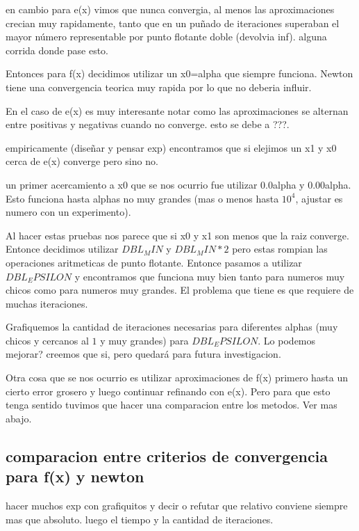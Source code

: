 en cambio para e(x) vimos que nunca convergia, al menos las aproximaciones
crecian muy rapidamente, tanto que en un puñado de iteraciones superaban el
mayor número representable por punto flotante doble (devolvia inf). %
alguna corrida donde pase esto.

Entonces para f(x) decidimos utilizar un x0=alpha que siempre funciona. Newton
tiene una convergencia teorica muy rapida por lo que no deberia influir.

En el caso de e(x) es muy interesante notar como las aproximaciones se alternan
entre positivas y negativas cuando no converge. esto se debe a ???.


empiricamente (diseñar y pensar exp) encontramos que si elejimos un x1 y x0
cerca de e(x) converge pero sino no.

un primer acercamiento a x0 que se nos ocurrio fue utilizar 0.0alpha y
0.00alpha. Esto funciona hasta alphas no muy grandes (mas o menos hasta $10^4$,
ajustar es numero con un experimento).

Al hacer estas pruebas nos parece que si x0 y x1 son menos que la raiz
converge. Entonce decidimos utilizar $DBL_MIN$ y $DBL_MIN * 2$ pero estas rompian
las operaciones aritmeticas de punto flotante. Entonce pasamos a utilizar
$DBL_EPSILON$ y encontramos que funciona muy bien tanto para numeros muy chicos
como para numeros muy grandes. El problema que tiene es que requiere de muchas
iteraciones.

Grafiquemos la cantidad de iteraciones necesarias para diferentes alphas (muy
chicos y cercanos al $1$ y muy grandes) para $DBL_EPSILON$. Lo podemos mejorar?
creemos que si, pero quedará para futura investigacion.

Otra cosa que se nos ocurrio es utilizar aproximaciones de f(x) primero hasta
un cierto error grosero y luego continuar refinando con e(x). Pero para que
esto tenga sentido tuvimos que hacer una comparacion entre los metodos. Ver mas
abajo.

\subsection{comparacion entre criterios de convergencia para f(x) y newton}

hacer muchos exp con grafiquitos y decir o refutar que relativo conviene
siempre mas que absoluto. luego el tiempo y la cantidad de iteraciones.

